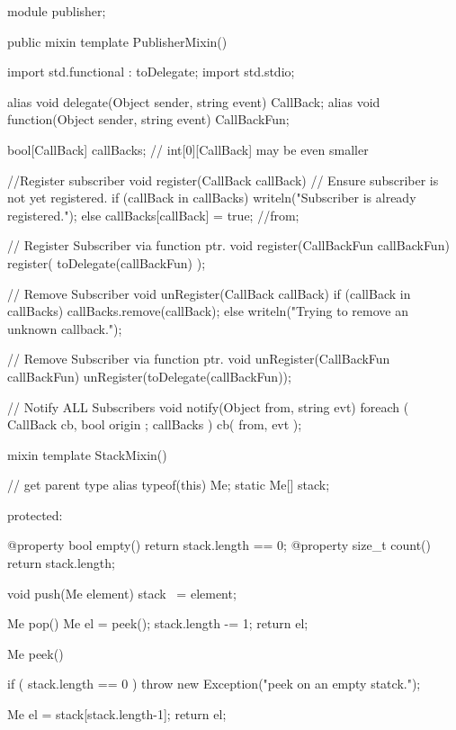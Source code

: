 \begin{dcode}
module publisher;

public mixin template PublisherMixin()
{
    import std.functional : toDelegate;
    import std.stdio;
    
    alias void delegate(Object sender, string event) CallBack;
    alias void function(Object sender, string event) CallBackFun;
    
    
    bool[CallBack] callBacks;  // int[0][CallBack] may be even smaller
    
    //Register subscriber
    void register(CallBack callBack)
    {
    // Ensure subscriber is not yet registered.
        if (callBack in callBacks)
            writeln("Subscriber is already registered.");   
        else
            callBacks[callBack] = true; //from;               
    }

// Register Subscriber via function ptr.
    void register(CallBackFun callBackFun)
    {
        register( toDelegate(callBackFun) );
    }

    // Remove Subscriber
    void unRegister(CallBack callBack)
    {
        if (callBack in callBacks)
            callBacks.remove(callBack);
        else
            writeln("Trying to remove an unknown callback.");       
    }

    // Remove Subscriber via function ptr.
    void unRegister(CallBackFun callBackFun)
    {
        unRegister(toDelegate(callBackFun));
    }

    // Notify ALL Subscribers
    void notify(Object from, string evt)
    {               
        foreach ( CallBack cb, bool origin ; callBacks )
        {
            cb( from, evt );
        }
    }
}

mixin template StackMixin() 
{
    // get parent type
    alias typeof(this) Me;
    static Me[] stack;
            
protected:
    
    @property bool empty()  { return stack.length == 0;  }  
    @property size_t count()   { return stack.length; }        
                    
    void push(Me element)
    {
        stack ~= element;
    }       
 
    Me pop()
    {
        Me el = peek();
        stack.length -= 1;
        return el;
    }
    
    Me peek()
    {
        if ( stack.length == 0 )
            throw new Exception("peek on an empty statck.");
        
        Me el = stack[stack.length-1];
        return el;
    }
}
\end{dcode}

